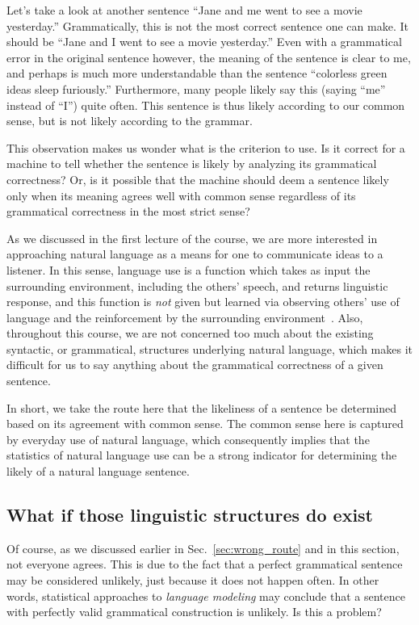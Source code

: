 \documentclass{report}
\begin{document}
Let's take a look at another sentence ``Jane and me went to see a movie
yesterday.'' Grammatically, this is not the most correct sentence one can make.
It should be ``Jane and I went to see a movie yesterday.'' Even with a
grammatical error in the original sentence however, the meaning of the sentence
is clear to me, and perhaps is much more understandable than the sentence
``colorless green ideas sleep furiously.'' Furthermore, many people likely say
this (saying ``me'' instead of ``I'') quite often. This sentence is thus likely
according to our common sense, but is not likely according to the grammar.

This observation makes us wonder what is the criterion to use. Is it correct for
a machine to tell whether the sentence is likely by analyzing its grammatical
correctness? Or, is it possible that the machine should deem a sentence likely
only when its meaning agrees well with common sense regardless of its
grammatical correctness in the most strict sense?

As we discussed in the first lecture of the course, we are more interested in
approaching natural language as a means for one to communicate ideas to a
listener. In this sense, language use is a function which takes as input the
surrounding environment, including the others' speech, and returns linguistic
response, and this function is {\em not} given but learned via observing others'
use of language and the reinforcement by the surrounding
environment~\cite{skinner2014verbal}. Also, throughout this course, we are not
concerned too much about the existing syntactic, or grammatical, structures
underlying natural language, which makes it difficult for us to say anything
about the grammatical correctness of a given sentence.

In short, we take the route here that the likeliness of a sentence be determined
based on its agreement with common sense. The common sense here is captured by
everyday use of natural language, which consequently implies that the statistics
of natural language use can be a strong indicator for determining the likely of
a natural language sentence. 

\subsection{What if those linguistic structures do exist}
\label{sec:linguistic_lm}

Of course, as we discussed earlier in Sec.~\ref{sec:wrong_route} and in this
section, not everyone agrees.  This is due to the fact that a perfect
grammatical sentence may be considered unlikely, just because it does not happen
often. In other words, statistical approaches to {\em language modeling} may
conclude that a sentence with perfectly valid grammatical construction is
unlikely. Is this a problem? 
\end{document}
